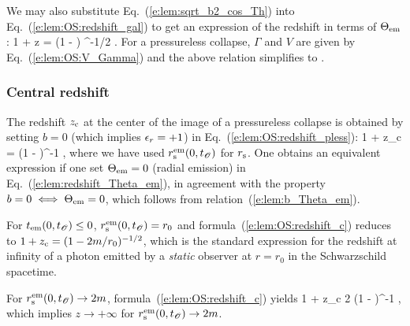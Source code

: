 We may also substitute Eq.~(\ref{e:lem:sqrt_b2_cos_Th}) into Eq.~(\ref{e:lem:OS:redshift_gal})
to get an expression of the redshift in terms of $\Theta_{\rm em}$:
\be \label{e:lem:redshift_Theta_em_gal}
     1 + z = \left(1 -  \right) ^{-1/2}
      .
\ee
For a pressureless collapse, $\Gamma$ and $V$ are given by Eq.~(\ref{e:lem:OS:V_Gamma}) and
the above relation simplifies to
\be \label{e:lem:redshift_Theta_em}
     .
\ee

\subsubsection{Central redshift}

The redshift $z_{\rm c}$ at the center of the image of a pressureless collapse
is obtained by setting $b=0$ (which implies $\epsilon_r=+1$) in Eq.~(\ref{e:lem:OS:redshift_pless}):
\be \label{e:lem:OS:redshift_c}
     1 + z_{\rm c} = \left(1 -  \right)^{-1}
     ,
\ee
where we have used $r_{\rm s}^{\rm em}(0,t_{\mathscr{O}})$ for $r_{\rm s}$.
One obtains an equivalent expression if one set $\Theta_{\rm em} = 0$
(radial emission) in Eq.~(\ref{e:lem:redshift_Theta_em}), in agreement with
the property $b=0 \iff \Theta_{\rm em} = 0$, which follows from relation~(\ref{e:lem:b_Theta_em}).

For $t_{\rm em}(0,t_{\mathscr{O}}) \leq 0$, $r_{\rm s}^{\rm em}(0,t_{\mathscr{O}}) = r_0$ and
formula~(\ref{e:lem:OS:redshift_c}) reduces to
$1 + z_{\rm c} = (1 - 2m/r_0)^{-1/2}$, which is the standard expression for the redshift at infinity of
a photon emitted by a \emph{static} observer at $r=r_0$ in the Schwarzschild spacetime.

For $r_{\rm s}^{\rm em}(0,t_{\mathscr{O}}) \to 2 m$, formula~(\ref{e:lem:OS:redshift_c}) yields
\be \label{e:lem:OS:redshift_sim}
    1 + z_{\rm c}   2 
     \left(1 -  \right)^{-1} ,
\ee
which implies $z \to +\infty$ for $r_{\rm s}^{\rm em}(0,t_{\mathscr{O}}) \to 2 m$.


